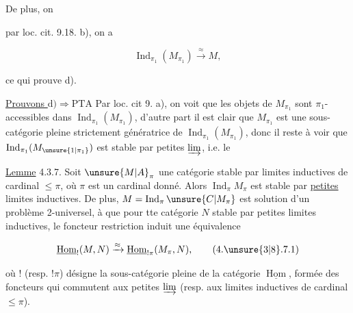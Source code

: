 
De plus, on


par loc. cit. 9.18. b), on a

\[
\operatorname{Ind}_{\pi_1}(M_{\pi_1})\xrightarrow{\approx}M,
\]

ce qui prouve d).

\uline{Prouvons $\mathrm{d})\Longrightarrow\mathrm{PTA}$} Par loc. cit 9. a),  on voit que les objets de $M_{\pi_1}$ sont $\pi_1$-accessibles dans $\operatorname{Ind}_{\pi_1}(M_{\pi_1})$,  d'autre part il est clair que $M_{\pi_1}$ est une sous-catégorie pleine strictement génératrice de  $\operatorname{Ind}_{\pi_1}(M_{\pi_1})$, donc il reste à voir que $\operatorname{Ind}_{\pi_1}(M_{\unsure{1|\pi_1}})$ est stable par petites $\varinjlim$, i.e. le

\uline{Lemme} 4.3.7. Soit $\unsure{M|A}_\pi$ une catégorie stable par limites inductives de cardinal $\leq\pi$, où $\pi$ est un cardinal  donné. Alors $\operatorname{Ind}_{\pi}M_{\pi}$ est stable par \uline{petites} limites inductives. De plus,  $M=\operatorname{Ind}_{\pi}\unsure{C|M_\pi}$ est solution d'un problème 2-universel, à  que   pour tte catégorie $N$ stable par petites limites inductives, le foncteur restriction  induit une équivalence

\[
\underline{\operatorname{Hom}}_{!}(M,N)\xrightarrow{\approx}
\underline{\operatorname{Hom}}_{!\pi}(M_{\pi},N),
\tag*{(4.\unsure{3|8}.7.1)}
\]

où    $!$ (resp. $!\pi$) désigne la sous-catégorie pleine de la catégorie $\underline{\operatorname{Hom}}$, formée des foncteurs qui commutent aux petites $\varinjlim$ (resp. aux limites inductives de cardinal $\leq\pi$).

